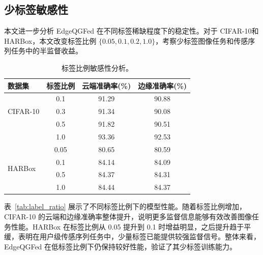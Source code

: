 \documentclass[journal]{IEEEtran}
\begin{document}
\subsection{少标签敏感性}
\label{subsec:sensitivity}
本文进一步分析 EdgeQGFed 在不同标签稀缺程度下的稳定性。对于 CIFAR-10和HARBox，本文改变标签比例 $\{0.05,0.1,0.2,1.0\}$，考察少标签图像任务和传感序列任务中的半监督收益。
\begin{table}[t]
\centering
\caption{标签比例敏感性分析。}
\label{tab:sensitivity}
\begin{tabular}{lccc}
\toprule
数据集 & 标签比例 & 云端准确率(\%) & 边缘准确率(\%) \\
\midrule
\multirow{3}{*}{CIFAR-10} & 0.1 & 91.29 & 90.88 \\
 & 0.3 & 91.34 & 90.08 \\
 & 0.5 & 91.82 & 90.51 \\
 & 1.0 & 93.36 & 92.53 \\
 \midrule
\multirow{4}{*}{HARBox}  & 0.05 & 80.65 & 80.59 \\
 & 0.1 & 84.14 & 84.09 \\
 & 0.5 & 84.37 & 84.31 \\
 & 1.0 & 84.44 & 84.37 \\
\bottomrule
\end{tabular}
\end{table}

表~\ref{tab:label_ratio} 展示了不同标签比例下的模型性能。随着标签比例增加，CIFAR-10 的云端和边缘准确率整体提升，说明更多监督信息能够有效改善图像任务性能。HARBox 在标签比例从 0.05 提升到 0.1 时增益明显，之后提升趋于平缓，表明在用户级传感序列任务中，少量标签已能提供较强监督信号。整体来看，EdgeQGFed 在低标签比例下仍保持较好性能，验证了其少标签训练能力。
\end{document}
